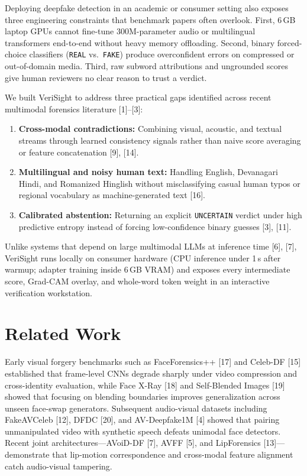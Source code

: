 \documentclass[conference]{IEEEtran}
\begin{document}
Deploying deepfake detection in an academic or consumer setting also exposes three engineering constraints that benchmark papers often overlook. First, 6\,GB laptop GPUs cannot fine-tune 300M-parameter audio or multilingual transformers end-to-end without heavy memory offloading. Second, binary forced-choice classifiers (\texttt{REAL} vs.\ \texttt{FAKE}) produce overconfident errors on compressed or out-of-domain media. Third, raw subword attributions and ungrounded scores give human reviewers no clear reason to trust a verdict.

We built VeriSight to address three practical gaps identified across recent multimodal forensics literature [1]--[3]:
\begin{enumerate}
\item \textbf{Cross-modal contradictions:} Combining visual, acoustic, and textual streams through learned consistency signals rather than naive score averaging or feature concatenation [9], [14].
\item \textbf{Multilingual and noisy human text:} Handling English, Devanagari Hindi, and Romanized Hinglish without misclassifying casual human typos or regional vocabulary as machine-generated text [16].
\item \textbf{Calibrated abstention:} Returning an explicit \texttt{UNCERTAIN} verdict under high predictive entropy instead of forcing low-confidence binary guesses [3], [11].
\end{enumerate}

Unlike systems that depend on large multimodal LLMs at inference time [6], [7], VeriSight runs locally on consumer hardware (CPU inference under 1\,s after warmup; adapter training inside 6\,GB VRAM) and exposes every intermediate score, Grad-CAM overlay, and whole-word token weight in an interactive verification workstation.

\section{Related Work}
Early visual forgery benchmarks such as FaceForensics++ [17] and Celeb-DF [15] established that frame-level CNNs degrade sharply under video compression and cross-identity evaluation, while Face X-Ray [18] and Self-Blended Images [19] showed that focusing on blending boundaries improves generalization across unseen face-swap generators. Subsequent audio-visual datasets including FakeAVCeleb [12], DFDC [20], and AV-Deepfake1M [4] showed that pairing unmanipulated video with synthetic speech defeats unimodal face detectors. Recent joint architectures—AVoiD-DF [7], AVFF [5], and LipForensics [13]—demonstrate that lip-motion correspondence and cross-modal feature alignment catch audio-visual tampering.
\end{document}
